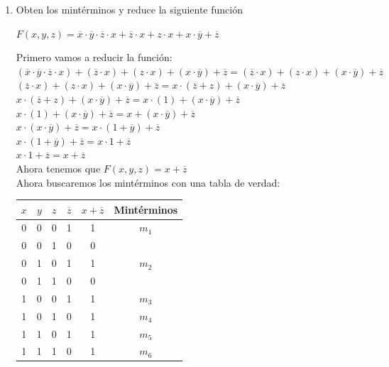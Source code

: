 \documentclass[a4paper,12pt]{article}
\begin{document}
\begin{enumerate}[label=\textcolor{teal}{\textbf{\arabic*.}}]

    \item Obten los mintérminos y reduce la siguiente función 
        \begin{center}
            $F(x,y,z) = \overline{x} \cdot \overline{y} \cdot \overline{z} \cdot x + \overline{z} \cdot x + z \cdot x + x \cdot \overline{y} + \overline{z} $
        \end{center}
        Primero vamos a reducir la función:\\
        $(\overline{x} \cdot \overline{y} \cdot \overline{z} \cdot x) + (\overline{z} \cdot x) + (z \cdot x) + (x \cdot \overline{y}) + \overline{z} = (\overline{z} \cdot x) + (z \cdot x) + (x \cdot \overline{y}) + \overline{z} $\\
        $(\overline{z} \cdot x) + (z \cdot x) + (x \cdot \overline{y}) + \overline{z} = x \cdot (\overline{z} + z) + (x \cdot \overline{y}) + \overline{z} $ \\
        $x \cdot (\overline{z} + z) + (x \cdot \overline{y}) + \overline{z} = x \cdot (1) + (x \cdot \overline{y}) + \overline{z} $\\
        $x \cdot (1) + (x \cdot \overline{y}) + \overline{z} = x + (x \cdot \overline{y}) + \overline{z} $\\
        $x \cdot (x \cdot \overline{y}) + \overline{z} = x \cdot (1 + \overline{y}) + \overline{z}$\\
        $x \cdot (1 + \overline{y}) + \overline{z} = x \cdot 1 + \overline{z}$\\
        $x \cdot 1 + \overline{z} = x + \overline{z}$\\
        Ahora tenemos que $F(x,y,z) = x + \overline{z}$\\
        Ahora buscaremos los mintérminos con una tabla de verdad:\\
        \begin{center}
            \begin{tabular}{|c|c|c|c|c|c|}
                \hline
                $x$ & $y$ & $z$ & $\overline{z}$ & $x + \overline{z}$ & Mintérminos\\ \hline
                0 & 0 & 0 & 1 & 1 & $m_{1}$\\ \hline
                0 & 0 & 1 & 0 & 0 & \\ \hline
                0 & 1 & 0 & 1 & 1 & $m_{2}$\\ \hline
                0 & 1 & 1 & 0 & 0 & \\ \hline
                1 & 0 & 0 & 1 & 1 & $m_{3}$\\ \hline
                1 & 0 & 1 & 0 & 1 & $m_{4}$\\ \hline
                1 & 1 & 0 & 1 & 1 & $m_{5}$\\ \hline
                1 & 1 & 1 & 0 & 1 & $m_{6}$\\ \hline
            \end{tabular}
        \end{center}


\end{enumerate}
\end{document}

